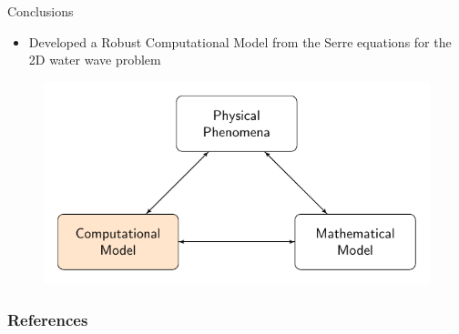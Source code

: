\documentclass[pdf]{beamer}
\begin{document}
\begin{frame}{Conclusions}
	\begin{itemize}
		\item Developed a Robust Computational Model from the Serre equations for the 2D water wave problem
	\end{itemize}
	\begin{figure}
		\includegraphics[width=\textwidth]{./Pics/ModelDiagrams/FlowChartHigh3O.pdf}
	\end{figure}
\end{frame}

\begin{frame}[allowframebreaks]
	\frametitle{References}
	
	
\end{frame}
\end{document}
